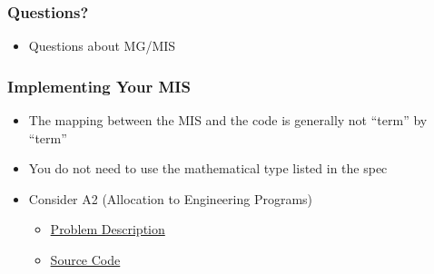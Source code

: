 \documentclass[t,12pt,numbers,fleqn]{beamer}
\begin{document}

\begin{frame}
\frametitle{Questions?}
\begin{itemize}
\item Questions about MG/MIS
\end{itemize}
\end{frame}


\begin{frame}
\frametitle{Implementing Your MIS}
\begin{itemize}
\item The mapping between the MIS and the code is generally not ``term'' by
  ``term''
\item You do not need to use the mathematical type listed in the spec
\item Consider A2 (Allocation to Engineering Programs)
\begin{itemize}
\item
  \href{https://gitlab.cas.mcmaster.ca/smiths/se2aa4_cs2me3/blob/master/Assignments/A2/A2.pdf}
  {Problem Description}
\item
  \href{https://gitlab.cas.mcmaster.ca/smiths/se2aa4_cs2me3/tree/master/Assignments/A2/A2Soln/src}
  {Source Code}
\end{itemize}

\end{itemize}
\end{frame}

\end{document}
